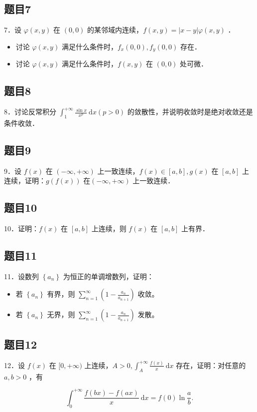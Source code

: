 \documentclass{article}
\begin{document}
\subsection{题目7}
7．设 \(\varphi(x, y)\) 在 \((0,0)\) 的某邻域内连续，\(f(x, y)=|x-y| \varphi(x, y)\) ．

\begin{itemize}
  \item[（1）] 讨论 \(\varphi(x, y)\) 满足什么条件时，\(f_{x}(0,0), f_{y}(0,0)\) 存在．
  \item[（2）] 讨论 \(\varphi(x, y)\) 满足什么条件时，\(f(x, y)\) 在 \((0,0)\) 处可微．
\end{itemize}

\subsection{题目8}
8．讨论反常积分 \(\int_{1}^{+\infty} \frac{\sin x}{x^{p}} \mathrm{~d} x(p>0)\) 的敛散性，并说明收敛时是绝对收敛还是条件收敛．

\subsection{题目9}
9．设 \(f(x)\) 在 \((-\infty,+\infty)\) 上一致连续，\(f(x) \in[a, b], g(x)\) 在 \([a, b]\) 上连续，证明：\(g(f(x))\) 在\((-\infty,+\infty)\) 上一致连续．

\subsection{题目10}
10．证明：\(f(x)\) 在 \([a, b]\) 上连续，则 \(f(x)\) 在 \([a, b]\) 上有界．

\subsection{题目11}
11．设数列 \(\left\{a_{n}\right\}\) 为恒正的单调增数列，证明：

\begin{itemize}
  \item[（1）] 若 \(\left\{a_{n}\right\}\) 有界，则 \(\sum_{n=1}^{\infty}\left(1-\frac{a_{n}}{a_{n+1}}\right)\) 收敛。
  \item[（2）] 若 \(\left\{a_{n}\right\}\) 无界，则 \(\sum_{n=1}^{\infty}\left(1-\frac{a_{n}}{a_{n+1}}\right)\) 发散。
\end{itemize}

\subsection{题目12}
12．设 \(f(x)\) 在 \([0,+\infty)\) 上连续，\(A>0, \int_{A}^{+\infty} \frac{f(x)}{x} \mathrm{~d} x\) 存在，证明：对任意的 \(a, b>0\) ，有

\[
\int_{0}^{+\infty} \frac{f(b x)-f(a x)}{x} \mathrm{~d} x=f(0) \ln \frac{a}{b} .
\]
\end{document}
